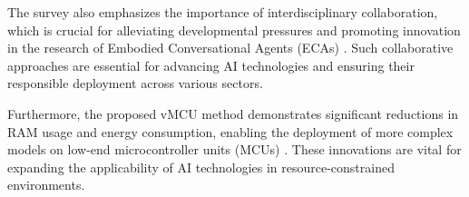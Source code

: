 The survey also emphasizes the importance of interdisciplinary collaboration, which is crucial for alleviating developmental pressures and promoting innovation in the research of Embodied Conversational Agents (ECAs) \cite{korre2023takesvillagemultidisciplinaritycollaboration}. Such collaborative approaches are essential for advancing AI technologies and ensuring their responsible deployment across various sectors.



Furthermore, the proposed vMCU method demonstrates significant reductions in RAM usage and energy consumption, enabling the deployment of more complex models on low-end microcontroller units (MCUs) \cite{zheng2024vmcucoordinatedmemorymanagement}. These innovations are vital for expanding the applicability of AI technologies in resource-constrained environments.